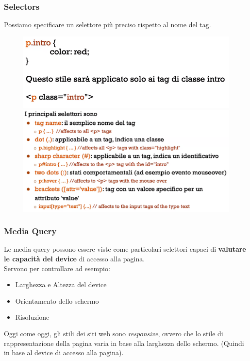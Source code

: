 \documentclass[12pt, a4paper]{article}
\begin{document}
    \subsubsection{Selectors}
    Possiamo specificare un selettore più preciso rispetto al nome del tag.
    \begin{figure}[htbp]
        \centering
        \includegraphics[scale=0.5]{selector.png}
        \includegraphics[scale=0.5]{selectors.png}
    \end{figure}

    \subsubsection{Media Query}
    Le media query possono essere viste come particolari selettori capaci di 
    \textbf{valutare le capacità del device} di accesso alla pagina.
    \\Servono per controllare ad esempio:
    \begin{itemize}
        \item Larghezza e Altezza del device
        \item Orientamento dello schermo
        \item Risoluzione
    \end{itemize}
    Oggi come oggi, gli stili dei siti web sono \textit{responsive}, ovvero che lo stile
    di rappresentazione della pagina varia in base alla larghezza dello schermo. 
    (Quindi in base al device di accesso alla pagina).
\end{document}
